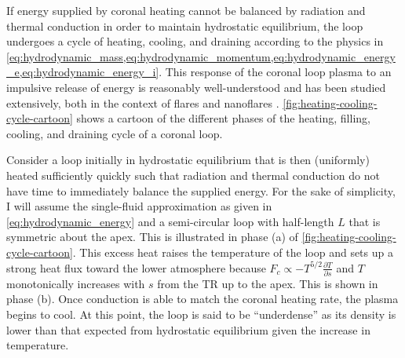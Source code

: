 If energy supplied by coronal heating cannot be balanced by radiation and thermal conduction in order to maintain hydrostatic equilibrium, the loop undergoes a cycle of heating, cooling, and draining according to the physics in \cref{eq:hydrodynamic_mass,eq:hydrodynamic_momentum,eq:hydrodynamic_energy_e,eq:hydrodynamic_energy_i}. This response of the coronal loop plasma to an impulsive release of energy is reasonably well-understood and has been studied extensively, both in the context of flares and nanoflares \citep[e.g.][]{antiochos_influence_1976,antiochos_evaporative_1978,cargill_implications_1994,cargill_cooling_1995,cargill_nanoflare_2004,bradshaw_cooling_2005,bradshaw_reinterpretation_2008,bradshaw_new_2010,bradshaw_cooling_2010}. \autoref{fig:heating-cooling-cycle-cartoon} shows a cartoon of the different phases of the heating, filling, cooling, and draining cycle of a coronal loop.

Consider a loop initially in hydrostatic equilibrium that is then (uniformly) heated sufficiently quickly such that radiation and thermal conduction do not have time to immediately balance the supplied energy. For the sake of simplicity, I will assume the single-fluid approximation as given in \autoref{eq:hydrodynamic_energy} and a semi-circular loop with half-length $L$ that is symmetric about the apex. This is illustrated in phase (a) of \autoref{fig:heating-cooling-cycle-cartoon}. This excess heat raises the temperature of the loop and sets up a strong heat flux toward the lower atmosphere because $F_c \propto -T^{5/2}\frac{\partial T}{\partial s}$ and $T$ monotonically increases with $s$ from the TR up to the apex. This is shown in phase (b). Once conduction is able to match the coronal heating rate, the plasma begins to cool. At this point, the loop is said to be ``underdense'' as its density is lower than that expected from hydrostatic equilibrium given the increase in temperature.

